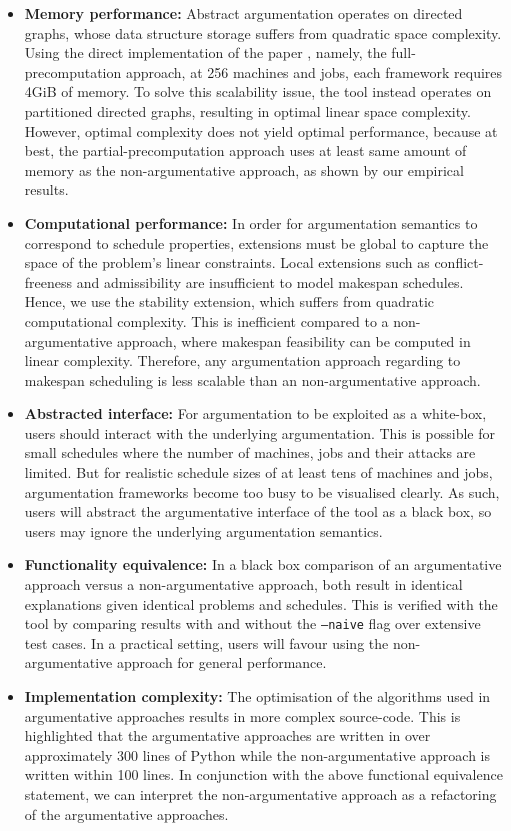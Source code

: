 \begin{itemize}
	\item\textbf{Memory performance:} Abstract argumentation operates on directed graphs, whose data structure storage suffers from quadratic space complexity. Using the direct implementation of the paper \cite{aes}, namely, the full-precomputation approach, at 256 machines and jobs, each framework requires 4GiB of memory. To solve this scalability issue, the tool instead operates on partitioned directed graphs, resulting in optimal linear space complexity. However, optimal complexity does not yield optimal performance, because at best, the partial-precomputation approach uses at least same amount of memory as the non-argumentative approach, as shown by our empirical results.
	\item\textbf{Computational performance:} In order for argumentation semantics to correspond to schedule properties, extensions must be global to capture the space of the problem's linear constraints. Local extensions such as conflict-freeness and admissibility are insufficient to model makespan schedules. Hence, we use the stability extension, which suffers from quadratic computational complexity. This is inefficient compared to a non-argumentative approach, where makespan feasibility can be computed in linear complexity. Therefore, any argumentation approach regarding to makespan scheduling is less scalable than an non-argumentative approach.
	\item\textbf{Abstracted interface:} For argumentation to be exploited as a white-box, users should interact with the underlying argumentation. This is possible for small schedules where the number of machines, jobs and their attacks are limited. But for realistic schedule sizes of at least tens of machines and jobs, argumentation frameworks become too busy to be visualised clearly. As such, users will abstract the argumentative interface of the tool as a black box, so users may ignore the underlying argumentation semantics.
	\item\textbf{Functionality equivalence:} In a black box comparison of an argumentative approach versus a non-argumentative approach, both result in identical explanations given identical problems and schedules. This is verified with the tool by comparing results with and without the \texttt{--naive} flag over extensive test cases. In a practical setting, users will favour using the non-argumentative approach for general performance.
	\item\textbf{Implementation complexity: }The optimisation of the algorithms used in argumentative approaches results in more complex source-code. This is highlighted that the argumentative approaches are written in over approximately 300 lines of Python while the non-argumentative approach is written within 100 lines. In conjunction with the above functional equivalence statement, we can interpret the non-argumentative approach as a refactoring of the argumentative approaches.
\end{itemize}

